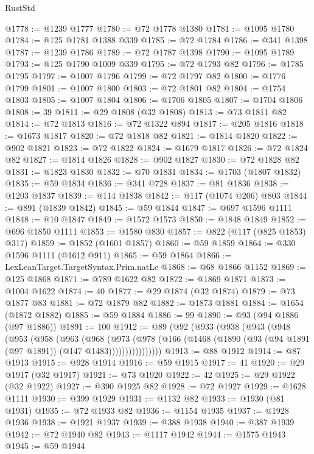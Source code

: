 \begin{lexlean}{RustStd}
\begin{coremodule}
{\begin{coremodule}
{{{{{{{{{{{{{{{{{{{{{{{{{{{{{{{{{{{{{{{{{{{{{{{{{{{{{{{@1778 := @1239 @1777
@1780 := @72 @1778 @1380
@1781 := @1095 @1780
@1784 := @125 @1781 @1388 @339
@1785 := @72 @1784
@1786 := @341 @1398
@1787 := @1239 @1786
@1789 := @72 @1787 @1398
@1790 := @1095 @1789
@1793 := @125 @1790 @1009 @339
@1795 := @72 @1793 @82
@1796 := @1785 @1795
@1797 := @1007 @1796
@1799 := @72 @1797 @82
@1800 := @1776 @1799
@1801 := @1007 @1800
@1803 := @72 @1801 @82
@1804 := @1754 @1803
@1805 := @1007 @1804
@1806 := @1706 @1805
@1807 := @1704 @1806
@1808 := 39
@1811 := @29 @1808 (@32 @1808)
@1813 := @73 @1811 @82
@1814 := @72 @1813
@1816 := @72 @1322 @894
@1817 := @205 @1816
@1818 := @1673 @1817
@1820 := @72 @1818 @82
@1821 := @1814 @1820
@1822 := @902 @1821
@1823 := @72 @1822
@1824 := @1679 @1817
@1826 := @72 @1824 @82
@1827 := @1814 @1826
@1828 := @902 @1827
@1830 := @72 @1828 @82
@1831 := @1823 @1830
@1832 := @70 @1831
@1834 := @1703 (@1807 @1832)
@1835 := @59 @1834
@1836 := @341 @728
@1837 := @81 @1836
@1838 := @1203 @1837
@1839 := @114 @1838
@1842 := @117 (@1074 @206) @803
@1844 := @891 (@1839 @1842)
@1845 := @59 @1844
@1847 := @697 @1596 @1111
@1848 := @10 @1847
@1849 := @1572 @1573
@1850 := @1848 @1849
@1852 := @696 @1850 @1111
@1853 := @1580 @830
@1857 := @822 (@117 (@825 @1853) @317)
@1859 := @1852 (@1601 @1857)
@1860 := @59 @1859
@1864 := @330 @1596 @1111 (@1612 @911)
@1865 := @59 @1864
@1866 := LexLeanTarget.TargetSyntax.Prim.natLe
@1868 := @68 @1866 @1152
@1869 := @125 @1868
@1871 := @789 @1622 @82
@1872 := @1869 @1871
@1873 := @1004 @1622
@1874 := 40
@1877 := @29 @1874 (@32 @1874)
@1879 := @73 @1877 @83
@1881 := @72 @1879 @82
@1882 := @1873 @1881
@1884 := @1654 (@1872 @1882)
@1885 := @59 @1884
@1886 := 99
@1890 := @93 (@94 @1886 (@97 @1886))
@1891 := 100
@1912 := @89
    (@92
      (@933
        (@938
          (@943
            (@948
              (@953
                (@958
                  (@963
                    (@968
                      (@973
                        (@978
                          (@166
                            (@1468 (@1890 (@93 (@94 @1891 (@97 @1891)) (@147 @1483))))))))))))))))
@1913 := @88 @1912
@1914 := @87 @1913
@1915 := @928 @1914
@1916 := @59 @1915
@1917 := 41
@1920 := @29 @1917 (@32 @1917)
@1921 := @73 @1920
@1922 := 42
@1925 := @29 @1922 (@32 @1922)
@1927 := @390 @1925 @82
@1928 := @72 @1927
@1929 := @1628 @1111
@1930 := @399 @1929
@1931 := @1132 @82
@1933 := @1930 (@81 @1931)
@1935 := @72 @1933 @82
@1936 := @1154 @1935
@1937 := @1928 @1936
@1938 := @1921 @1937
@1939 := @388 @1938
@1940 := @387 @1939
@1942 := @72 @1940 @82
@1943 := @1117 @1942
@1944 := @1575 @1943
@1945 := @59 @1944
}}}}}}}}}}}}}}}}}}}}}}}}}}}}}}}}}}}}}}}}}}}}}}}}}}}}}}}
\end{coremodule}}
\end{coremodule}
\end{lexlean}
